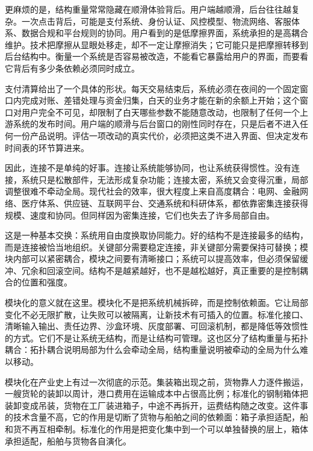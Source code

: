 更麻烦的是，结构重量常常隐藏在顺滑体验背后。用户端越顺滑，后台往往越复杂。一次点击背后，可能是支付系统、身份认证、风控模型、物流网络、客服体系、数据合规和平台规则的协同。用户看到的是低摩擦界面，系统承担的是高耦合维护。技术把摩擦从显眼处移走，却不一定让摩擦消失；它可能只是把摩擦转移到后台结构中\cite{star1999layers}。衡量一个系统是否容易被改造，不能看它暴露给用户的界面，而要看它背后有多少条依赖必须同时成立。

支付清算给出了一个具体的形状。每天交易结束后，系统必须在夜间的一个固定窗口内完成对账、差错处理与资金归集，白天的业务才能在新的余额上开始；这个窗口对用户完全不可见，却限制了白天哪些参数不能随意改动，也限制了任何一个上游系统的发布时间\cite{kahn2009why}。用户端的顺滑与后台窗口的刚性同时存在，只是后者不进入任何一份产品说明。评估一项改动的真实代价，必须把这类不进入界面、但决定发布时间表的环节算进来。


因此，连接不是单纯的好事。连接让系统能够协同，也让系统获得惯性。没有连接，系统只是松散部件，无法形成复杂功能；连接太密，系统又会变得沉重，局部调整很难不牵动全局。现代社会的效率，很大程度上来自高度耦合：电网、金融网络、医疗体系、供应链、互联网平台、交通系统和科研体系，都依靠密集连接获得规模、速度和协同。但同样因为密集连接，它们也失去了许多局部自由。

这是一种基本交换：系统用自由度换取协同能力。好的结构不是连接最多的结构，而是连接被恰当地组织。关键部分需要稳定连接，非关键部分需要保持可替换；模块内部可以紧密耦合，模块之间要有清晰接口；系统可以提高效率，但必须保留缓冲、冗余和回滚空间。结构不是越紧越好，也不是越松越好，真正重要的是控制耦合的位置和强度\cite{boccaletti2006complex}。

模块化的意义就在这里。模块化不是把系统机械拆碎，而是控制依赖面。它让局部变化不必无限扩散，让失败可以被隔离，让新技术有可插入的位置。标准化接口、清晰输入输出、责任边界、沙盒环境、灰度部署、可回滚机制，都是降低等效惯性的方式。它们不是让系统无结构，而是让结构可管理\cite{baldwin2000design}。这也区分了结构重量与拓扑耦合：拓扑耦合说明局部为什么会牵动全局，结构重量说明被牵动的全局为什么难以移动。

模块化在产业史上有过一次彻底的示范。集装箱出现之前，货物靠人力逐件搬运，一艘货轮的装卸以周计，港口费用在运输成本中占很高比例；标准化的钢制箱体把装卸变成吊装，货物在工厂装进箱子，中途不再拆开，运费结构随之改变\cite{bernhofen2016estimating}。这件事的技术含量不高，它的作用是切断了货物与船舶之间的依赖面：箱子承担适配，船和货不再互相牵制。标准化的作用是把变化集中到一个可以单独替换的层上，箱体承担适配，船舶与货物各自演化。

